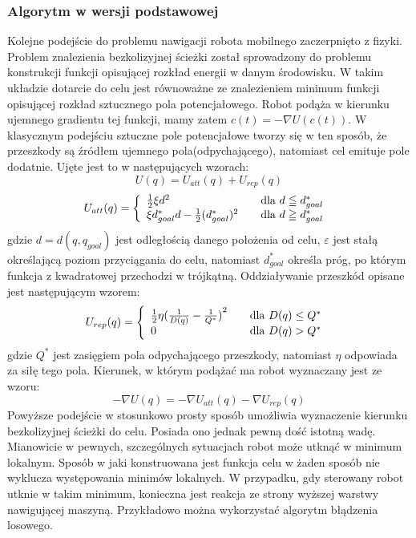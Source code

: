 \subsubsection{Algorytm w wersji podstawowej}
	Kolejne podejście do problemu nawigacji robota mobilnego zaczerpnięto z fizyki. Problem znalezienia bezkolizyjnej ścieżki został sprowadzony do problemu konstrukcji
	funkcji opisującej rozkład energii w danym środowisku. W takim układzie dotarcie do celu jest równoważne ze znalezieniem minimum funkcji opisującej rozkład sztucznego pola
	potencjałowego. Robot podąża w kierunku ujemnego gradientu tej funkcji, mamy zatem $c(t)=- \nabla U(c(t))$. W klasycznym podejściu sztuczne pole potencjałowe tworzy
	się w ten sposób, że przeszkody są źródłem ujemnego pola(odpychającego), natomiast cel emituje pole dodatnie. Ujęte jest to w następujących wzorach:
	\begin{equation}
	U(q) = U_{att}(q) + U_{rep}(q)
	\end{equation}
	\begin{equation}\label{eq:U_att}
		U_{att}(q) = \left\{ 
		\begin{array}{l l}
		\frac{1}{2}\xi d^2 & \quad \mbox{dla $d\leqq d^{*}_{goal}$ }\\
		\xi d^{*}_{goal}d - \frac{1}{2}(d^{*}_{goal})^{2} & \quad \mbox{dla $d\geqq d^{*}_{goal}$ }\\
		\end{array} \right. 
	\end{equation}
	gdzie $d=d(q,q_{goal})$ jest odległością danego położenia od celu, $\varepsilon$ jest stałą określającą poziom przyciągania do celu, natomiast $d^{*}_{goal}$ określa próg,
	po którym funkcja z kwadratowej przechodzi w trójkątną.
	Oddziaływanie przeszkód opisane jest następującym wzorem:
	\begin{equation}
		U_{rep}(q) = \left\{ 
		\begin{array}{l l}
		\frac{1}{2} \eta{ ( \frac{1}{D(q)} - \frac{1}{ Q^{*} } )}^2  & \quad \mbox{dla $D(q)\leq Q^{*} $ }\\
		0 & \quad \mbox{dla $D(q)> Q^{*}$ }\\
		\end{array} \right.
	\end{equation}
	gdzie $ Q^{*} $ jest zasięgiem pola odpychającego przeszkody, natomiast $\eta$ odpowiada za siłę tego pola. 
	Kierunek, w którym podążać ma robot wyznaczany jest ze wzoru:
	\begin{equation}
	- \nabla U(q) = - \nabla U_{att}(q) - \nabla U_{rep}(q)
	\end{equation}
	Powyższe podejście w stosunkowo prosty sposób umożliwia wyznaczenie kierunku bezkolizyjnej ścieżki do celu. Posiada ono jednak pewną dość istotną wadę. Mianowicie w pewnych, 
	szczególnych sytuacjach robot może utknąć w minimum lokalnym. Sposób w jaki konstruowana jest funkcja celu w żaden sposób nie wyklucza występowania minimów lokalnych.
	W przypadku, gdy sterowany robot utknie w takim minimum, konieczna jest reakcja ze strony wyższej warstwy nawigującej maszyną. Przykładowo można wykorzystać algorytm 
	błądzenia losowego.
